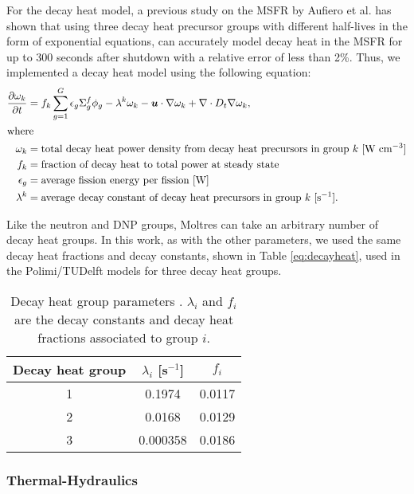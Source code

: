For the decay heat model, a previous study on the MSFR by Aufiero et al.
\cite{aufiero_extended_2013} has shown that using three decay heat precursor
groups with different half-lives in the form of exponential equations, can
accurately model decay heat in the MSFR for up to 300 seconds after shutdown
with a relative error of less than 2\%. Thus, we implemented a decay heat
model using the following equation:
%
\begin{align}
	\frac{\partial \omega_k}{\partial t} &= f_k \sum^G_{g=1} \epsilon_{g}
	\Sigma^f_{g} \phi_{g} - \lambda^k \omega_k - \boldsymbol{u} \cdot \nabla
	\omega_k + \nabla \cdot D_t \nabla \omega_k, \label{eq:decayheat} \\
	\intertext{where}
    \omega_k &= \text{total decay heat power density from decay heat
    precursors in group $k$ [W cm$^{-3}$]} \nonumber \\
	f_k &= \text{fraction of decay heat to total power at steady state}
	\nonumber \\
	\epsilon_g &= \text{average fission energy per fission [W]} \nonumber \\
	\lambda^k &= \text{average decay constant of decay heat precursors in
	group $k$ [s$^{-1}$].} \nonumber
\end{align}

Like the neutron and \gls{DNP} groups, Moltres can take an arbitrary number of
decay heat groups. In this work, as with the other parameters, we used the
same decay heat fractions and decay constants, shown in Table
\ref{eq:decayheat}, used in the Polimi/TUDelft models for three decay heat
groups.

\begin{table}[htb!]
	\centering
	\caption{Decay heat group parameters \cite{fiorina_modelling_2014}.
	$\lambda_i$ and $f_i$ are the decay constants and decay heat fractions
	associated to group $i$.}
	\begin{tabular}{S S S}
		\toprule
		{Decay heat group} & {$\lambda_i$ [s$^{-1}$]} & {$f_i$} \\
		 & 0.1974 & 0.0117 \\
		2 & 0.0168 & 0.0129 \\
		3 & 0.000358 & 0.0186 \\
		\bottomrule
	\end{tabular}
	\label{table:decayheat}
\end{table}

\subsubsection{Thermal-Hydraulics}

